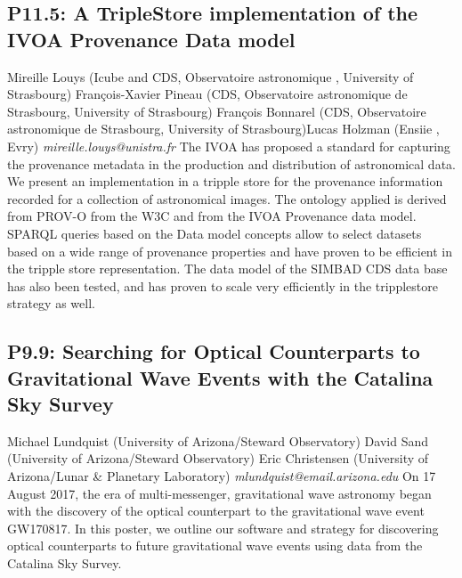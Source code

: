 \documentclass{report}
\begin{document}
\subsection*{P11.5: A TripleStore implementation of the IVOA Provenance Data model}
\bigskip
Mireille Louys (Icube and CDS, Observatoire astronomique , University of Strasbourg) \newline François-Xavier Pineau (CDS, Observatoire astronomique de Strasbourg, University of Strasbourg) \newline  François Bonnarel (CDS, Observatoire astronomique de Strasbourg, University of Strasbourg)\newline  Lucas Holzman (Ensiie , Evry)\newline  \newline  \newline\newline
{\it mireille.louys@unistra.fr}\newline
\newline\newline
The IVOA  has proposed a standard for capturing the provenance metadata in the production and distribution of astronomical data.
We present an implementation in a tripple store for the provenance information recorded for a collection of astronomical images. 
The ontology applied is derived from PROV-O  from the W3C and from the IVOA Provenance data model. SPARQL queries  based on the Data model concepts allow to select datasets based on a wide range of provenance properties and have proven to be efficient in the tripple store representation. The data model of the SIMBAD CDS data base  has also been tested, and has proven to scale very efficiently in the tripplestore strategy as well.\newline
\newpage
\subsection*{P9.9: Searching for Optical Counterparts to Gravitational Wave Events with the Catalina Sky Survey}
\bigskip
Michael Lundquist (University of Arizona/Steward Observatory) \newline David Sand (University of Arizona/Steward Observatory) \newline  Eric Christensen (University of Arizona/Lunar \& Planetary Laboratory)\newline   \newline  \newline  \newline\newline
{\it mlundquist@email.arizona.edu}\newline
\newline\newline
On 17 August 2017, the era of multi-messenger, gravitational wave astronomy began with the discovery of the optical counterpart to the gravitational wave event GW170817.  In this poster, we outline our software and strategy for discovering optical counterparts to future gravitational wave events using data from the Catalina Sky Survey.\newline
\newpage
\end{document}
